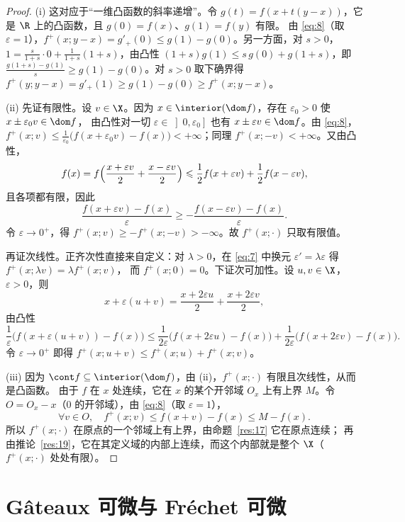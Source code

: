 \begin{proof}
(i) 这对应于“一维凸函数的斜率递增”。令 $g(t)=f(x+t(y-x))$，它是 $\R$ 上的凸函数，且 $g(0)=f(x)$、$g(1)=f(y)$ 有限。
由 \eqref{eq:8}（取 $\varepsilon=1$），$f^+(x;y-x)=g'_+(0)\leqslant g(1)-g(0)$。另一方面，对 $s>0$，
$1=\frac{s}{1+s}\cdot0+\frac{1}{1+s}(1+s)$，由凸性 $(1+s)g(1)\leqslant s\,g(0)+g(1+s)$，即
$\frac{g(1+s)-g(1)}{s}\geqslant g(1)-g(0)$。对 $s>0$ 取下确界得 $f^+(y;y-x)=g'_+(1)\geqslant g(1)-g(0)\geqslant f^+(x;y-x)$。

(ii) 先证有限性。设 $v\in\X$。因为 $x\in\interior(\dom f)$，存在 $\varepsilon_0>0$ 使 $x\pm\varepsilon_0v\in\dom f$，
由凸性对一切 $\varepsilon\in\left]0,\varepsilon_0\right]$ 也有 $x\pm\varepsilon v\in\dom f$。由 \eqref{eq:8}，
$f^+(x;v)\leqslant\frac1{\varepsilon_0}\bigl(f(x+\varepsilon_0v)-f(x)\bigr)<+\infty$；同理 $f^+(x;-v)<+\infty$。又由凸性，
\[
  f(x)=f\Bigl(\frac{x+\varepsilon v}{2}+\frac{x-\varepsilon v}{2}\Bigr)\leqslant\frac12f(x+\varepsilon v)+\frac12f(x-\varepsilon v),
\]
且各项都有限，因此
\[
  \frac{f(x+\varepsilon v)-f(x)}{\varepsilon}\geqslant-\frac{f(x-\varepsilon v)-f(x)}{\varepsilon}.
\]
令 $\varepsilon\to0^+$，得 $f^+(x;v)\geqslant-f^+(x;-v)>-\infty$。故 $f^+(x;\cdot)$ 只取有限值。

再证次线性。正齐次性直接来自定义：对 $\lambda>0$，在 \eqref{eq:7} 中换元 $\varepsilon'=\lambda\varepsilon$ 得 $f^+(x;\lambda v)=\lambda f^+(x;v)$，
而 $f^+(x;0)=0$。下证次可加性。设 $u,v\in\X$，$\varepsilon>0$，则
\[
  x+\varepsilon(u+v)=\frac{x+2\varepsilon u}{2}+\frac{x+2\varepsilon v}{2},
\]
由凸性
\[
  \frac1\varepsilon\bigl(f(x+\varepsilon(u+v))-f(x)\bigr)\leqslant\frac{1}{2\varepsilon}\bigl(f(x+2\varepsilon u)-f(x)\bigr)+\frac{1}{2\varepsilon}\bigl(f(x+2\varepsilon v)-f(x)\bigr).
\]
令 $\varepsilon\to0^+$ 即得 $f^+(x;u+v)\leqslant f^+(x;u)+f^+(x;v)$。

(iii) 因为 $\cont f\subseteq\interior(\dom f)$，由 (ii)，$f^+(x;\cdot)$ 有限且次线性，从而是凸函数。
由于 $f$ 在 $x$ 处连续，它在 $x$ 的某个开邻域 $O_x$ 上有上界 $M$。令 $O=O_x-x$（$0$ 的开邻域），由 \eqref{eq:8}（取 $\varepsilon=1$），
\[
  \forall v\in O,\quad f^+(x;v)\leqslant f(x+v)-f(x)\leqslant M-f(x).
\]
所以 $f^+(x;\cdot)$ 在原点的一个邻域上有上界，由命题~\ref{res:17} 它在原点连续；
再由推论~\ref{res:19}，它在其定义域的内部上连续，而这个内部就是整个 $\X$（$f^+(x;\cdot)$ 处处有限）。
\end{proof}

\section{Gâteaux 可微与 Fréchet 可微}

